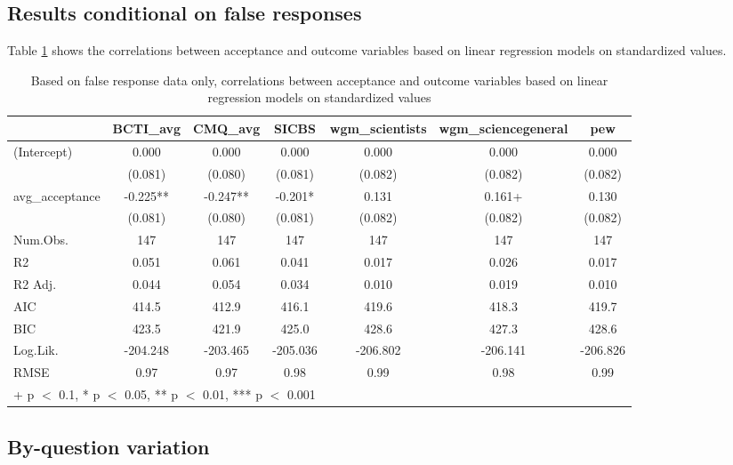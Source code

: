 \documentclass[
  doc,floatsintext]{apa6}
\begin{document}
\subsection{Results conditional on false responses}\label{results-conditional-on-false-responses-1}

Table \ref{tab:exp2-false-response-regression} shows the correlations between acceptance and outcome variables based on linear regression models on standardized values.

\begin{table}

\caption{\label{tab:exp2-false-response-regression}Based on false response data only, correlations between acceptance and outcome variables based on linear regression models on standardized values}
\centering
\begin{tabular}[t]{lcccccc}
\toprule
  & BCTI\_avg & CMQ\_avg & SICBS & wgm\_scientists & wgm\_sciencegeneral & pew\\
\midrule
(Intercept) & 0.000 & 0.000 & 0.000 & 0.000 & 0.000 & 0.000\\
 & (0.081) & (0.080) & (0.081) & (0.082) & (0.082) & \vphantom{1} (0.082)\\
avg\_acceptance & -0.225** & -0.247** & -0.201* & 0.131 & 0.161+ & 0.130\\
 & (0.081) & (0.080) & (0.081) & (0.082) & (0.082) & (0.082)\\
\midrule
Num.Obs. & 147 & 147 & 147 & 147 & 147 & 147\\
R2 & 0.051 & 0.061 & 0.041 & 0.017 & 0.026 & 0.017\\
R2 Adj. & 0.044 & 0.054 & 0.034 & 0.010 & 0.019 & 0.010\\
AIC & 414.5 & 412.9 & 416.1 & 419.6 & 418.3 & 419.7\\
BIC & 423.5 & 421.9 & 425.0 & 428.6 & 427.3 & 428.6\\
Log.Lik. & -204.248 & -203.465 & -205.036 & -206.802 & -206.141 & -206.826\\
RMSE & 0.97 & 0.97 & 0.98 & 0.99 & 0.98 & 0.99\\
\bottomrule
\multicolumn{7}{l}{\rule{0pt}{1em}+ p $<$ 0.1, * p $<$ 0.05, ** p $<$ 0.01, *** p $<$ 0.001}\\
\end{tabular}
\end{table}

\subsection{By-question variation}\label{by-question-variation-1}
\end{document}
